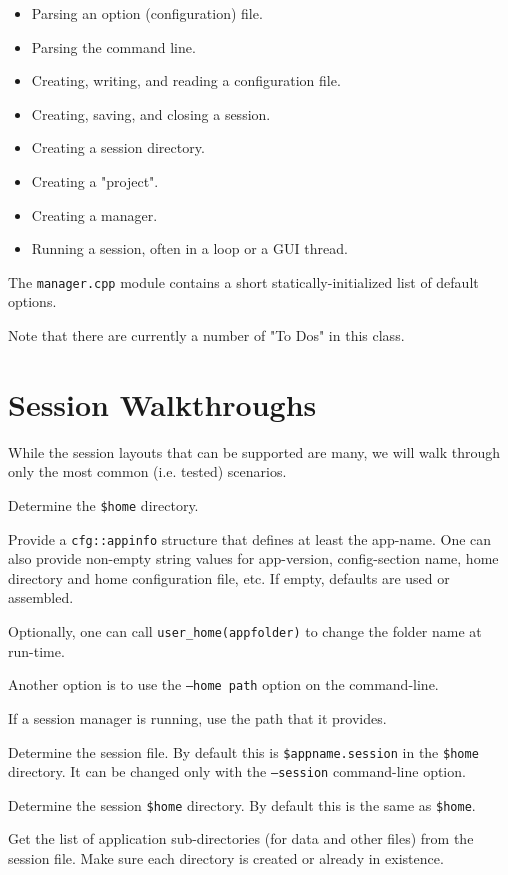    \begin{itemize}
      \item Parsing an option (configuration) file.
      \item Parsing the command line.
      \item Creating, writing, and reading a configuration file.
      \item Creating, saving, and closing a session.
      \item Creating a session directory.
      \item Creating a "project".
      \item Creating a manager.
      \item Running a session, often in a loop or a GUI thread.
   \end{itemize}
   
   The \texttt{manager.cpp} module contains a short
   statically-initialized list of
   default options.

   Note that there are currently a number of "To Dos" in this class.

\section{Session Walkthroughs}
\label{sec:session_walkthroughs}

	While the session layouts that can be supported are many, we will
	walk through only the most common (i.e. tested) scenarios.

   \begin{enumber}
      \item Determine the \texttt{\$home} directory.
      \begin{enumber}
         \item Provide a \texttt{cfg::appinfo} structure
            that defines at least the app-name.  One can also provide
            non-empty string values for app-version, config-section name,
            home directory and home configuration file, etc. If empty,
            defaults are used or assembled.
         \item Optionally, one can call \texttt{user\_home(appfolder)}
            to change the folder name at run-time.
         \item Another option is to use the \texttt{--home path} option
            on the command-line.
         \item If a session manager is running, use the path that it
            provides.
      \end{enumber}
      \item Determine the session file.
         By default this is \texttt{\$appname.session} in the \texttt{\$home}
         directory. It can be changed only with the \texttt{--session}
         command-line option.
      \item Determine the session \texttt{\$home} directory.
         By default this is the same as \texttt{\$home}.
      \item Get the list of application sub-directories (for data and
         other files) from the session file.
         Make sure each directory is created or already in existence.
   \end{enumber}

